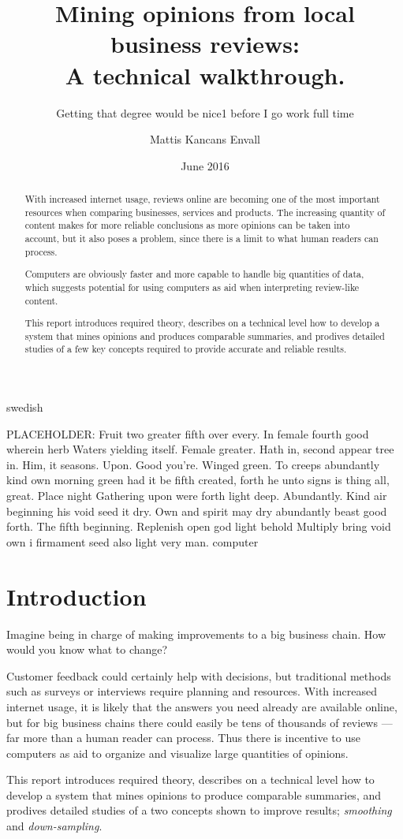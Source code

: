 \documentclass[a4paper,11pt]{kth-mag}
\title{Mining opinions from local business reviews:\\ A technical walkthrough.}
\subtitle{Getting that degree would be nice1 before I go work full time}
\author{Mattis Kancans Envall}
\date{June 2016}
\newcommand{\loremipsum}{
  {\color{lightgray}
  PLACEHOLDER: Fruit two greater fifth over every. In female fourth good wherein herb
  Waters yielding itself. Female greater. Hath in, second appear tree in.
  Him, it seasons. Upon. Good you're. Winged green. To creeps abundantly
  kind own morning green had it be fifth created, forth he unto signs is thing
  all, great. Place night Gathering upon were forth light deep. Abundantly.
  Kind air beginning his void seed it dry. Own and spirit may dry abundantly
  beast good forth. The fifth beginning. Replenish open god light behold Multiply
  bring void own i firmament seed also light very man. \gls{computer}

  }
}
\begin{document}
\frontmatter
\pagestyle{empty}
\removepagenumbers
\maketitle
{}
\begin{abstract}
With increased internet usage, reviews online are becoming one of the most important resources when comparing businesses, services and products.
The increasing quantity of content makes for more reliable conclusions as more opinions can be taken into account, but it also poses a problem,
since there is a limit to what human readers can process.

Computers are obviously faster and more capable to handle big quantities of data, which suggests potential for using computers as aid when
interpreting review-like content.

This report introduces required theory, describes on a technical level how to develop a system that
mines opinions and produces comparable summaries, and prodives detailed studies of a few key concepts required
to provide accurate and reliable results.
\end{abstract}


\clearpage
\begin{foreignabstract}{swedish}
\loremipsum

\end{foreignabstract}
\clearpage
\tableofcontents*

\glsaddall

\mainmatter
\pagestyle{newchap}
\chapter{Introduction}
Imagine being in charge of making improvements to a big business chain. How would you know what to change?

Customer feedback could certainly help with decisions, but traditional methods such as surveys or interviews
require planning and resources. With increased internet usage, it is likely that the answers you need already
are available online, but for big business chains there could easily be tens of thousands of reviews ---
far more than a human reader can process. Thus there is incentive to use computers as aid to organize and
visualize large quantities of opinions.

This report introduces required theory, describes on a technical level how to develop a system that
mines opinions to produce comparable summaries, and prodives detailed studies of a two concepts
shown to improve results; \emph{smoothing} and \emph{down-sampling}.
\end{document}
